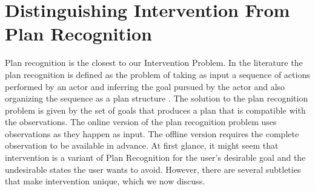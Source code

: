 \section{Distinguishing Intervention From Plan Recognition}
Plan recognition is the closest to our Intervention Problem. 
In the literature the plan recognition is defined as the problem of taking as input a sequence of actions performed by an actor and inferring the goal pursued by the actor and also organizing the sequence as a plan structure \cite{kautz1986generalized,schmidt1978}. 
The solution to the plan recognition problem is given by the set of goals that produces a plan that is compatible with the observations. 
The online version of the plan recognition problem uses observations as they happen as input. 
The offline version requires the complete observation to be available in advance. 
At first glance, it might seem that intervention is a variant of Plan Recognition for the user's desirable goal and the undesirable states the user wants to avoid. 
However, there are several subtleties that make intervention unique, which we now discuss.

